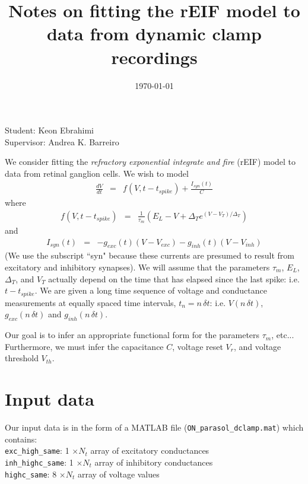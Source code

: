 \documentclass[11pt]{article}
\begin{document}
\title{Notes on fitting the rEIF model to data from dynamic clamp recordings}
\author{}
\date{\today}
\maketitle
\begin{center}
Student: Keon Ebrahimi\\
Supervisor: Andrea K. Barreiro
\end{center}

We consider fitting the \textit{refractory exponential integrate and fire} (rEIF) model to data from retinal ganglion cells. 
We wish to model
\begin{eqnarray}
\frac{dV}{dt} & = &  f(V,t-t_{spike}) + \frac{I_{syn}(t)}{C}   \label{eqn:EIF_balance}
\end{eqnarray}
where
\begin{eqnarray}
f(V,t-t_{spike}) & = & \frac{1}{\tau_m} \left(E_L - V + \Delta_T e^{(V-V_T)/\Delta_T} \right) \label{eqn:fI_shape}
\end{eqnarray}
and 
\begin{eqnarray}
I_{syn}(t) & = & -g_{exc}(t)(V-V_{exc}) - g_{inh}(t)(V-V_{inh})
\end{eqnarray}
(We use the subscript ``syn" because these currents are presumed to result from excitatory and inhibitory synapses). We will assume that the parameters $\tau_m$, $E_L$, $\Delta_T$, and $V_T$ actually depend on the time that has elapsed since the last spike: i.e. $t-t_{spike}$. We are given a long time sequence of voltage and conductance measurements at equally spaced time intervals, $t_n = n \, \delta t$: i.e.  $V(n \, \delta t)$, $g_{exc}(n \, \delta t)$ and $g_{inh}(n \,  \delta t)$.
 
Our goal is to infer an appropriate functional form for the parameters $\tau_m$, etc... Furthermore, we must infer the capacitance $C$, voltage reset $V_r$, and voltage threshold $V_{th}$. 

\section{Input data}
Our input data is in the form of a MATLAB file (\texttt{ON\_parasol\_dclamp.mat}) which contains:\\

\noindent
\texttt{exc\_high\_same}: 1 $\times N_t$ array of excitatory conductances\\
\texttt{inh\_highc\_same}: 1 $\times N_t$ array of inhibitory conductances\\
\texttt{highc\_same}: 8 $\times N_t$ array of voltage values\\
\end{document}
